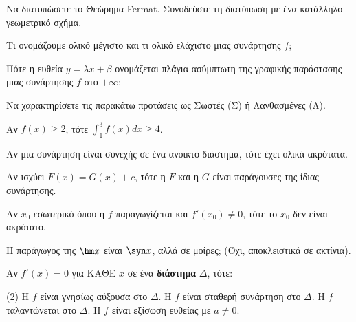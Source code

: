 \documentclass[11pt,a4paper]{article}
\newcommand{\kerkissans}[1]{{\fontfamily{maksf}\selectfont \textbf{#1}}}
\renewcommand{\textdexiakeraia}{}
\newcommand{\dint}{\displaystyle\int}
\newcommand\themanum{A}
\newcounter{thema}[section]
\renewcommand{\thethema}{\arabic{thema}}
\newcommand{\Thema}{\refstepcounter{thema}{\textbf{\textcolor{black}{\faPenSquare\ \  \large \kerkissans{\textbf{\thethemaο\hspace{2mm}Διαγώνισμα - Θέμα \themanum}}}}}\hspace{0mm}}{}
\newenvironment{thema}[1]
{\begin{tcolorbox}[title=\Thema\kerkissans{\textbf{\large{  #1}}},breakable,
enhanced standard,titlerule=0pt,toprule=0pt, rightrule=0pt, bottomrule=0pt,
colback=white,left=0mm,top=1mm,bottom=0mm,
boxrule=0pt,
colframe=white,leftrule=0mm,sharp corners,coltitle=black]
\renewcommand{\themanum}{#1}}
{\end{tcolorbox}}
\begin{document}
\begin{thema}{A}
\begin{erwthma}
    \item Να διατυπώσετε το Θεώρημα Fermat. Συνοδεύστε τη διατύπωση με ένα κατάλληλο γεωμετρικό σχήμα.
    \item Τι ονομάζουμε ολικό μέγιστο και τι ολικό ελάχιστο μιας συνάρτησης $f$;
    \item Πότε η ευθεία $y=\lambda x+\beta$ ονομάζεται πλάγια ασύμπτωτη της γραφικής παράστασης μιας συνάρτησης $f$ στο $+\infty$;
    \item Να χαρακτηρίσετε τις παρακάτω προτάσεις ως Σωστές (Σ) ή Λανθασμένες (Λ).
    \begin{alist}
        \item Αν $f(x) \ge 2$, τότε $\dint_1^3 f(x) dx \ge 4$.
        \item Αν μια συνάρτηση είναι συνεχής σε ένα ανοικτό διάστημα, τότε έχει ολικά ακρότατα.
        \item Αν ισχύει $F(x) = G(x) + c$, τότε η $F$ και η $G$ είναι παράγουσες της ίδιας συνάρτησης.
        \item Αν $x_0$ εσωτερικό όπου η $f$ παραγωγίζεται και $f'(x_0) \ne 0$, τότε το $x_0$ δεν είναι ακρότατο.
        \item Η παράγωγος της $\hm x$ είναι $\syn x$, αλλά σε μοίρες; (Όχι, αποκλειστικά σε ακτίνια).
    \end{alist}
    \item Αν $f'(x) = 0$ για ΚΑΘΕ $x$ σε ένα \textbf{διάστημα} $\Delta$, τότε:
    \begin{tasks}[label=\let\textdexiakeraia\relax\alph*.](2)
        \task H $f$ είναι γνησίως αύξουσα στο $\Delta$.
        \task H $f$ είναι σταθερή συνάρτηση στο $\Delta$.
        \task H $f$ ταλαντώνεται στο $\Delta$.
        \task H $f$ είναι εξίσωση ευθείας με $a \ne 0$.
    \end{tasks}
\end{erwthma}
\end{thema}
\vspace{1cm}
\end{document}
